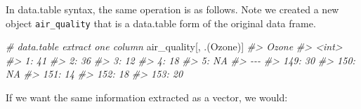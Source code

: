 \documentclass[
]{book}
\newenvironment{Shaded}{\begin{snugshade}}{\end{snugshade}}
\newcommand{\CommentTok}[1]{\textcolor[rgb]{0.56,0.35,0.01}{\textit{#1}}}
\newcommand{\NormalTok}[1]{#1}
\begin{document}
In data.table syntax, the same operation is as follows. Note we created a new object \texttt{air\_quality} that is a data.table form of the original data frame.

\begin{Shaded}
\begin{Highlighting}[]
\CommentTok{\# data.table extract one column }
\NormalTok{air\_quality[, .(Ozone)]}
\CommentTok{\#\textgreater{}      Ozone}
\CommentTok{\#\textgreater{}      \textless{}int\textgreater{}}
\CommentTok{\#\textgreater{}   1:    41}
\CommentTok{\#\textgreater{}   2:    36}
\CommentTok{\#\textgreater{}   3:    12}
\CommentTok{\#\textgreater{}   4:    18}
\CommentTok{\#\textgreater{}   5:    NA}
\CommentTok{\#\textgreater{}  {-}{-}{-}      }
\CommentTok{\#\textgreater{} 149:    30}
\CommentTok{\#\textgreater{} 150:    NA}
\CommentTok{\#\textgreater{} 151:    14}
\CommentTok{\#\textgreater{} 152:    18}
\CommentTok{\#\textgreater{} 153:    20}
\end{Highlighting}
\end{Shaded}

If we want the same information extracted as a vector, we would:
\end{document}
